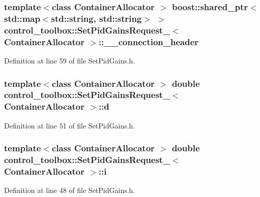 \subsubsection[{\-\_\-\-\_\-connection\-\_\-header}]{\setlength{\rightskip}{0pt plus 5cm}template$<$class Container\-Allocator $>$ boost\-::shared\-\_\-ptr$<$std\-::map$<$std\-::string, std\-::string$>$ $>$ {\bf control\-\_\-toolbox\-::\-Set\-Pid\-Gains\-Request\-\_\-}$<$ \-Container\-Allocator $>$\-::{\bf \-\_\-\-\_\-connection\-\_\-header}}\label{structcontrol__toolbox_1_1SetPidGainsRequest___af93323bc96ce2fbe8a34ccfce24eeeac}


\-Definition at line 59 of file \-Set\-Pid\-Gains.\-h.

\subsubsection[{d}]{\setlength{\rightskip}{0pt plus 5cm}template$<$class Container\-Allocator $>$ double {\bf control\-\_\-toolbox\-::\-Set\-Pid\-Gains\-Request\-\_\-}$<$ \-Container\-Allocator $>$\-::{\bf d}}\label{structcontrol__toolbox_1_1SetPidGainsRequest___ac5e967561cc92c447e1060b980f3742e}


\-Definition at line 51 of file \-Set\-Pid\-Gains.\-h.

\subsubsection[{i}]{\setlength{\rightskip}{0pt plus 5cm}template$<$class Container\-Allocator $>$ double {\bf control\-\_\-toolbox\-::\-Set\-Pid\-Gains\-Request\-\_\-}$<$ \-Container\-Allocator $>$\-::{\bf i}}\label{structcontrol__toolbox_1_1SetPidGainsRequest___a3c33e67623e4ce47942ffd6689308bb4}


\-Definition at line 48 of file \-Set\-Pid\-Gains.\-h.

